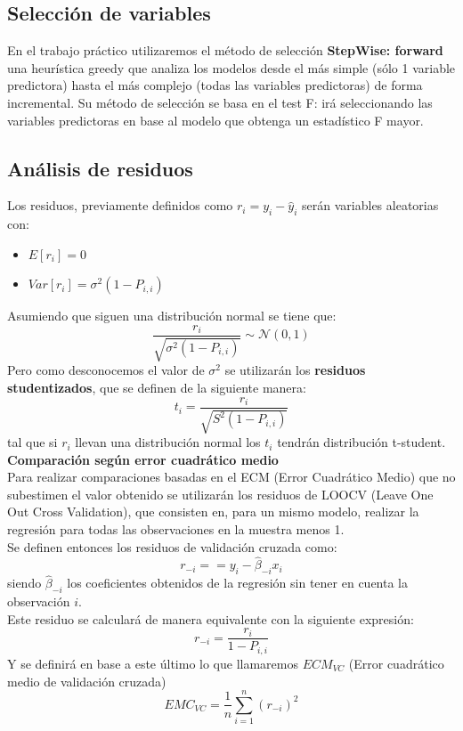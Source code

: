 \subsection*{Selección de variables}
En el trabajo práctico utilizaremos el método de selección \textbf{StepWise: forward} una heurística greedy que analiza los modelos desde el más simple (sólo 1 variable predictora) hasta el más complejo (todas las variables predictoras) de forma incremental. Su método de selección se basa en el test F: irá seleccionando las variables predictoras en base al modelo que obtenga un estadístico F mayor.

\subsection*{Análisis de residuos}
Los residuos, previamente definidos como $r_i = y_i - \hat{y}_{i}$ serán variables aleatorias con:
\begin{center}
    \begin{itemize}
        \item $E[r_i] = 0$
        \item $Var[r_i] = {\sigma}^2(1-P_{i,i})$
    \end{itemize}
\end{center}
Asumiendo que siguen una distribución normal se tiene que:
$$
\frac{r_i}{\sqrt{\sigma^2 (1-P_{i,i})}} \sim \mathcal{N}(0, 1)
$$
Pero como desconocemos el valor de $\sigma^2$ se utilizarán los \textbf{residuos studentizados}, que se definen de la siguiente manera:
$$
t_i = \frac{r_i}{\sqrt{S^2(1-P_{i,i})}}
$$
tal que si $r_i$ llevan una distribución normal los $t_i$ tendrán distribución t-student.
\vskip0.2cm\textbf{Comparación según error cuadrático medio}\\
Para realizar comparaciones basadas en el ECM (Error Cuadrático Medio) que no subestimen el valor obtenido se utilizarán los residuos de LOOCV (Leave One Out Cross Validation), que consisten en, para un mismo modelo, realizar la regresión para todas las observaciones en la muestra menos 1.\\
Se definen entonces los residuos de validación cruzada como:
$$
r_{-i} =  = y_{i} - \hat{\beta}_{-i} x_i
$$
siendo $\hat{\beta}_{-i}$ los coeficientes obtenidos de la regresión sin tener en cuenta la observación $i$.\\
Este residuo se calculará de manera equivalente con la siguiente expresión:
$$
r_{-i} = \frac{r_i}{1-P_{i,i}}
$$
Y se definirá en base a este último lo que llamaremos $ECM_{VC}$ (Error cuadrático medio de validación cruzada)
$$
EMC_{VC} = \frac{1}{n} \sum^{n}_{i=1}(r_{-i})^2
$$